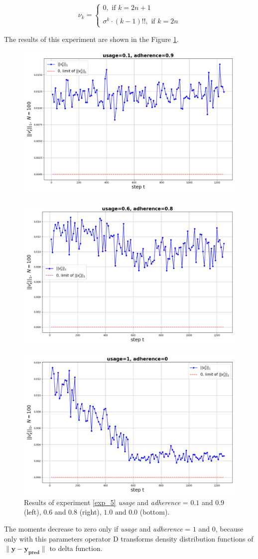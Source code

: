 \documentclass{article}
\begin{document}
        \begin{equation} \label{normal_moments}
            \nu_k = \left\{\begin{array}{ll}
                 0, \text{ if } k = 2n + 1\\
                 \\
                 \sigma^k \cdot (k - 1)!!, \text{ if } k = 2n
            \end{array} \right.
        \end{equation}

        The results of this experiment are shown in the Figure \ref{fig_exp_5}.
        
        \begin{figure}[h!]
            \centering
            \includegraphics[width=0.49\linewidth]{pictures/moments_0.1_0.9.png}~~
            ~~\includegraphics[width=0.49\linewidth]{pictures/moments_0.6_0.8.png}
            
            \includegraphics[width=0.49\linewidth]{pictures/moments_1_0.png}
            
            \caption{Results of experiment \ref{exp_5} \textit{usage} and \textit{adherence} = $0.1$ and $0.9$ (left), $0.6$ and $0.8$ (right), $1.0$ and $0.0$ (bottom).}
            \label{fig_exp_5}
        \end{figure}

        The moments decrease to zero only if \textit{usage} and \textit{adherence} = $1$ and $0$, because only with this parameters operator $\text{D}$ transforms density distribution functions of $\|\mathbf{y} - \mathbf{y_{\text{pred}}}\|$ to delta function.
    


\newpage


  
\end{document}
